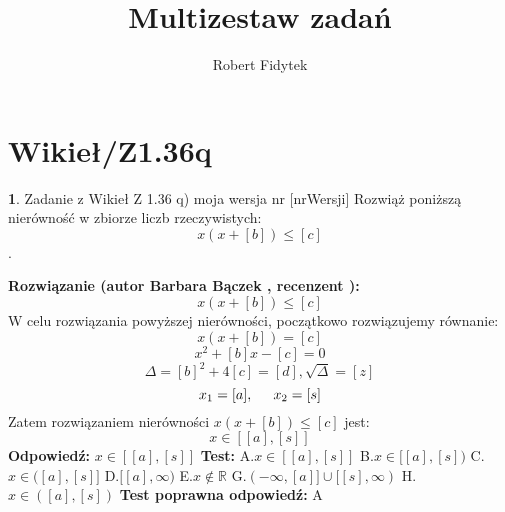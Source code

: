 \documentclass[12pt, a4paper]{article}
\title{Multizestaw zadań}
\author{Robert Fidytek}
\date{}
\theoremstyle{definition} %
\newtheorem{zad}{}
\newcommand{\kategoria}[1]{\section{#1}} %
\newcommand{\zadStart}[1]{\begin{zad}#1\newline} %
\newcommand{\zadStop}{\end{zad}}   %
\newcommand{\rozwStart}[2]{\noindent \textbf{Rozwiązanie (autor #1 , recenzent #2): }\newline} %
\newcommand{\rozwStop}{\newline}                                            %
\newcommand{\odpStart}{\noindent \textbf{Odpowiedź:}\newline}    %
\newcommand{\odpStop}{\newline}                                             %
\newcommand{\testStart}{\noindent \textbf{Test:}\newline} %
\newcommand{\testStop}{\newline} %
\newcommand{\kluczStart}{\noindent \textbf{Test poprawna odpowiedź:}\newline} %
\newcommand{\kluczStop}{\newline} %
\begin{document}
\maketitle


\kategoria{Wikieł/Z1.36q}
\zadStart{Zadanie z Wikieł Z 1.36 q) moja wersja nr [nrWersji]}
Rozwiąż poniższą nierówność w zbiorze liczb rzeczywistych: 
$$x(x+[b]) \le [c]$$.
\zadStop
\rozwStart{Barbara Bączek}{}
$$x(x+[b]) \le [c] $$ 
W celu rozwiązania powyższej nierówności, początkowo rozwiązujemy równanie:
$$x(x+[b]) = [c]$$ 
$$x^2+[b]x -[c] = 0$$
$$\Delta= [b]^2 + 4[c]=[d], \sqrt{\Delta}=[z]$$
$$x_1=[a], \hspace{0.5cm} x_2=[s]$$
Zatem rozwiązaniem nierówności $x(x+[b]) \le [c] $ jest:
$$ x \in [[a],[s]]$$
\rozwStop
\odpStart
$x \in [[a],[s]]$
\odpStop
\testStart
A.$ x \in [[a],[s]]$
B.$ x \in [[a], [s])$
C.$ x \in ([a],[s]]$
D.$[[a], \infty)$
E.$ x \notin \mathbb{R}$
G.$(-\infty, [a]] \cup [[s], \infty)$
H.$ x \in ([a],[s])$
\testStop
\kluczStart
A
\kluczStop
\end{document}
